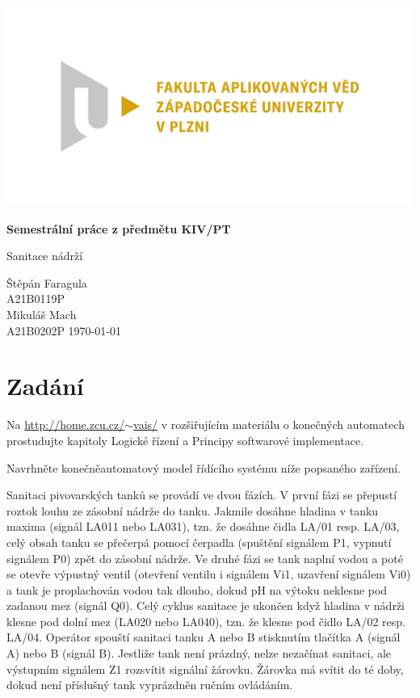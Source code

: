 \documentclass[12pt]{report}
\begin{document}
	
	\begin{titlepage}
		\centering
		\Large
		
		\includegraphics[width=.7\textwidth]{fav}
		
		\vspace{15mm}
		{\Huge\bfseries Semestrální práce z předmětu KIV/PT}
		
		\vspace{5mm}
		{\LARGE Sanitace nádrží}
		
		\vfill
		\raggedright
		Štěpán Faragula\\
		A21B0119P\\
		Mikuláš Mach\\
		A21B0202P
		\hfill 
		\today
	\end{titlepage}
	
	\tableofcontents
	
	\chapter{Zadání}
	Na \href{http://home.zcu.cz/~vais/}{http://home.zcu.cz/$\sim$vais/} v rozšiřujícím materiálu o konečných automatech prostudujte kapitoly Logické řízení a Principy softwarové implementace.
	
	Navrhněte konečněautomatový model řídícího systému níže popsaného zařízení.
	
	Sanitaci pivovarských tanků se provádí ve dvou fázích. V první fázi se přepustí roztok louhu ze zásobní nádrže do tanku. Jakmile dosáhne hladina v tanku maxima (signál LA011 nebo LA031), tzn. že dosáhne čidla LA/01 resp. LA/03, celý obsah tanku se přečerpá pomocí čerpadla (spuštění signálem P1, vypnutí signálem P0) zpět do zásobní nádrže. Ve druhé fázi se tank naplní vodou a poté se otevře výpustný ventil (otevření ventilu i signálem Vi1, uzavření signálem Vi0) a tank je proplachován vodou tak dlouho, dokud pH na výtoku neklesne pod zadanou mez (signál Q0). Celý cyklus sanitace je ukončen když hladina v nádrži klesne pod dolní mez (LA020 nebo LA040), tzn. že klesne pod čidlo LA/02 resp. LA/04. Operátor spouští sanitaci tanku A nebo B stisknutím tlačítka A (signál A) nebo B (signál B). Jestliže tank není prázdný, nelze nezačínat sanitaci, ale výstupním signálem Z1 rozsvítit signální žárovku. Žárovka má svítit do té doby, dokud není příslušný tank vyprázdněn ručním ovládáním.
	
\end{document}
